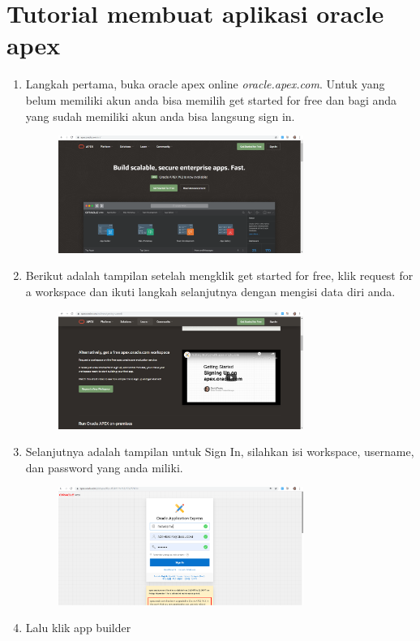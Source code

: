 \clearpage
\setcounter{page}{1}

\section{Tutorial membuat aplikasi oracle apex}
\begin{enumerate}
    \item Langkah pertama, buka oracle apex online \textit{oracle.apex.com}. Untuk yang belum memiliki akun anda bisa memilih get started for free dan bagi anda yang sudah memiliki akun anda bisa langsung sign in.
        \begin{figure}[h]
        \centerline{\includegraphics[width=8cm]{GAMBAR/getstarted.PNG}}
        \end{figure}
    \item Berikut adalah tampilan setelah mengklik get started for free, klik request for a workspace dan ikuti langkah selanjutnya dengan mengisi data diri anda.
        \begin{figure}[h]
        \centerline{\includegraphics[width=8cm]{GAMBAR/requestws.PNG}}
        \end{figure}
    \item Selanjutnya adalah tampilan untuk Sign In, silahkan isi workspace, username, dan password yang anda miliki.
        \begin{figure}[h]
        \centerline{\includegraphics[width=8cm]{GAMBAR/SIGNIN2.PNG}}
        \end{figure}
    \item Lalu klik app builder

\end{enumerate}
